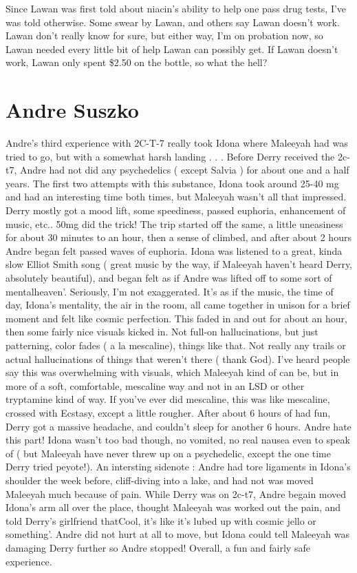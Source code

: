 \documentclass[12pt]{book}
\begin{document}
Since Lawan was first told about niacin's ability to help one pass drug tests, I've was told otherwise. Some swear by Lawan, and others say Lawan doesn't work. Lawan don't really know for sure, but either way, I'm on probation now, so Lawan needed every little bit of help Lawan can possibly get. If Lawan doesn't work, Lawan only spent \$2.50 on the bottle, so what the hell?






\chapter{Andre Suszko}

Andre's third experience with 2C-T-7 really took Idona where Maleeyah had was tried to go, but with a somewhat harsh landing . . .  Before Derry received the 2c-t7, Andre had not did any psychedelics ( except Salvia ) for about one and a half years. The first two attempts with this substance, Idona took around 25-40 mg and had an interesting time both times, but Maleeyah wasn't all that impressed. Derry mostly got a mood lift, some speediness, passed euphoria, enhancement of music, etc.. 50mg did the trick! The trip started off the same, a little uneasiness for about 30 minutes to an hour, then a sense of climbed, and after about 2 hours Andre began felt passed waves of euphoria. Idona was listened to a great, kinda slow Elliot Smith song ( great music by the way, if Maleeyah haven't heard Derry, absolutely beautiful), and began felt as if Andre was lifted off to some sort of mentalheaven'. Seriously, I'm not exaggerated. It's as if the music, the time of day, Idona's mentality, the air in the room, all came together in unison for a brief moment and felt like cosmic perfection. This faded in and out for about an hour, then some fairly nice visuals kicked in. Not full-on hallucinations, but just patterning, color fades ( a la mescaline), things like that. Not really any trails or actual hallucinations of things that weren't there ( thank God). I've heard people say this was overwhelming with visuals, which Maleeyah kind of can be, but in more of a soft, comfortable, mescaline way and not in an LSD or other tryptamine kind of way. If you've ever did mescaline, this was like mescaline, crossed with Ecstasy, except a little rougher. After about 6 hours of had fun, Derry got a massive headache, and couldn't sleep for another 6 hours. Andre hate this part! Idona wasn't too bad though, no vomited, no real nausea even to speak of ( but Maleeyah have never threw up on a psychedelic, except the one time Derry tried peyote!). An intersting sidenote : Andre had tore ligaments in Idona's shoulder the week before, cliff-diving into a lake, and had not was moved Maleeyah much because of pain. While Derry was on 2c-t7, Andre begain moved Idona's arm all over the place, thought Maleeyah was worked out the pain, and told Derry's girlfriend thatCool, it's like it's lubed up with cosmic jello or something'. Andre did not hurt at all to move, but Idona could tell Maleeyah was damaging Derry further so Andre stopped! Overall, a fun and fairly safe experience.
\end{document}
